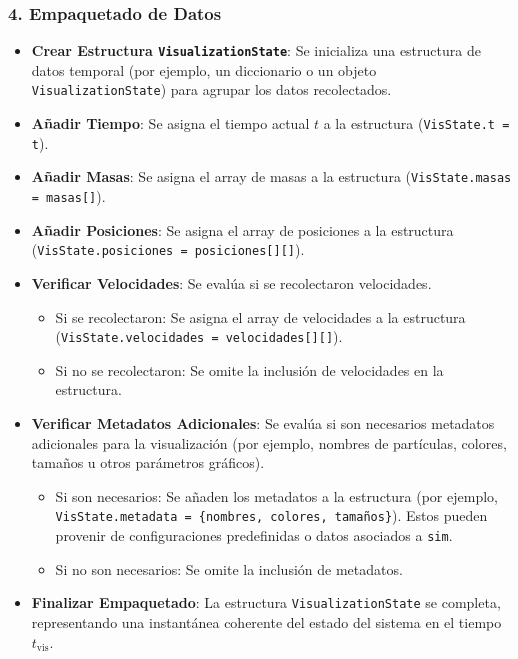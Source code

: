 \subsubsection*{4. Empaquetado de Datos}
\begin{itemize}
    \item \textbf{Crear Estructura \texttt{VisualizationState}}: Se inicializa una estructura de datos temporal (por ejemplo, un diccionario o un objeto \texttt{VisualizationState}) para agrupar los datos recolectados.
    \item \textbf{Añadir Tiempo}: Se asigna el tiempo actual $t$ a la estructura (\texttt{VisState.t = t}).
    \item \textbf{Añadir Masas}: Se asigna el array de masas a la estructura (\texttt{VisState.masas = masas[]}).
    \item \textbf{Añadir Posiciones}: Se asigna el array de posiciones a la estructura (\texttt{VisState.posiciones = posiciones[][]}).
    \item \textbf{Verificar Velocidades}: Se evalúa si se recolectaron velocidades.
    \begin{itemize}
        \item Si se recolectaron: Se asigna el array de velocidades a la estructura (\texttt{VisState.velocidades = velocidades[][]}).
        \item Si no se recolectaron: Se omite la inclusión de velocidades en la estructura.
    \end{itemize}
    \item \textbf{Verificar Metadatos Adicionales}: Se evalúa si son necesarios metadatos adicionales para la visualización (por ejemplo, nombres de partículas, colores, tamaños u otros parámetros gráficos).
    \begin{itemize}
        \item Si son necesarios: Se añaden los metadatos a la estructura (por ejemplo, \texttt{VisState.metadata = \{nombres, colores, tamaños\}}). Estos pueden provenir de configuraciones predefinidas o datos asociados a \texttt{sim}.
        \item Si no son necesarios: Se omite la inclusión de metadatos.
    \end{itemize}
    \item \textbf{Finalizar Empaquetado}: La estructura \texttt{VisualizationState} se completa, representando una instantánea coherente del estado del sistema en el tiempo $t_{\text{vis}}$.
\end{itemize}

